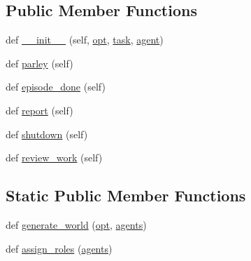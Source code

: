 \subsection*{Public Member Functions}
\begin{DoxyCompactItemize}
\item 
def \hyperlink{classparlai_1_1chat__service_1_1tasks_1_1qa__data__collection_1_1worlds_1_1QADataCollectionTaskWorld_ab84f1948bc80ae0de93567ea3e4488f2}{\+\_\+\+\_\+init\+\_\+\+\_\+} (self, \hyperlink{classparlai_1_1core_1_1worlds_1_1World_a3640d92718acd3e6942a28c1ab3678bd}{opt}, \hyperlink{classparlai_1_1chat__service_1_1tasks_1_1qa__data__collection_1_1worlds_1_1QADataCollectionTaskWorld_a2299f4d3d23e9d08be9430814aad9472}{task}, \hyperlink{classparlai_1_1chat__service_1_1tasks_1_1qa__data__collection_1_1worlds_1_1QADataCollectionTaskWorld_a2070bf88d1309e9f11d402ae58ae58cb}{agent})
\item 
def \hyperlink{classparlai_1_1chat__service_1_1tasks_1_1qa__data__collection_1_1worlds_1_1QADataCollectionTaskWorld_a2732be86dc4eba1255f5c27414f345d3}{parley} (self)
\item 
def \hyperlink{classparlai_1_1chat__service_1_1tasks_1_1qa__data__collection_1_1worlds_1_1QADataCollectionTaskWorld_aedbef1585d18e42ebed879e90cfc56a1}{episode\+\_\+done} (self)
\item 
def \hyperlink{classparlai_1_1chat__service_1_1tasks_1_1qa__data__collection_1_1worlds_1_1QADataCollectionTaskWorld_ab755c8e5982a600d176532d06fe50f3b}{report} (self)
\item 
def \hyperlink{classparlai_1_1chat__service_1_1tasks_1_1qa__data__collection_1_1worlds_1_1QADataCollectionTaskWorld_ac7f73536d3af94b755380148a9326a81}{shutdown} (self)
\item 
def \hyperlink{classparlai_1_1chat__service_1_1tasks_1_1qa__data__collection_1_1worlds_1_1QADataCollectionTaskWorld_af9036c044a97aeab846fbebad1c926ba}{review\+\_\+work} (self)
\end{DoxyCompactItemize}
\subsection*{Static Public Member Functions}
\begin{DoxyCompactItemize}
\item 
def \hyperlink{classparlai_1_1chat__service_1_1tasks_1_1qa__data__collection_1_1worlds_1_1QADataCollectionTaskWorld_a0c3ef21545611c4b2ada106aea5b3245}{generate\+\_\+world} (\hyperlink{classparlai_1_1core_1_1worlds_1_1World_a3640d92718acd3e6942a28c1ab3678bd}{opt}, \hyperlink{classparlai_1_1core_1_1worlds_1_1World_a728f75194cc26ea4035047c46cf62608}{agents})
\item 
def \hyperlink{classparlai_1_1chat__service_1_1tasks_1_1qa__data__collection_1_1worlds_1_1QADataCollectionTaskWorld_ad2cd59c59e84f1b504ee1df22f798d52}{assign\+\_\+roles} (\hyperlink{classparlai_1_1core_1_1worlds_1_1World_a728f75194cc26ea4035047c46cf62608}{agents})
\end{DoxyCompactItemize}
